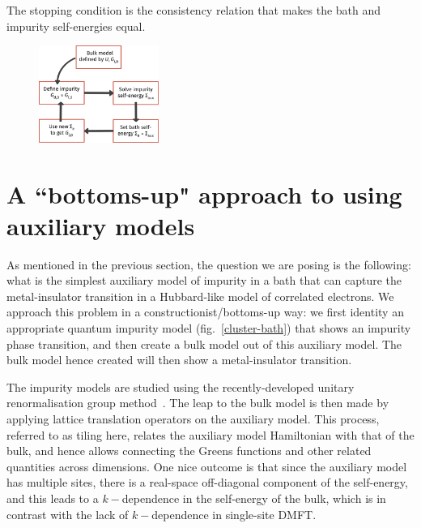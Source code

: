 \documentclass[reprint,hidelinks,onecolumn]{revtex4-2}
\begin{document}
The stopping condition is the consistency relation that makes the bath and impurity self-energies equal.

\begin{figure}[!htb]
	\centering
	\includegraphics[width=0.35\textwidth]{dmft_scheme.pdf}
\end{figure}


\section{A ``bottoms-up" approach to using auxiliary models}
As mentioned in the previous section, the question we are posing is the following: what is the simplest auxiliary model of impurity in a bath that can capture the metal-insulator transition in a Hubbard-like model of correlated electrons. We approach this problem in a constructionist/bottoms-up way: we first identity an appropriate quantum impurity model (fig.~\ref{cluster-bath}) that shows an impurity phase transition, and then create a bulk model out of this auxiliary model. The bulk model hence created will then show a metal-insulator transition. 

The impurity models are studied using the recently-developed unitary renormalisation group method~\cite{anirbanmott1,anirbanmott2,anirbanurg1,anirbanurg2,siddharthacpi,santanukagome}. The leap to the bulk model is then made by applying lattice translation operators on the auxiliary model. This process, referred to as tiling here, relates the auxiliary model Hamiltonian with that of the bulk, and hence allows connecting the Greens functions and other related quantities across dimensions. One nice outcome is that since the auxiliary model has multiple sites, there is a real-space off-diagonal component of the self-energy, and this leads to a \(k-\)dependence in the self-energy of the bulk, which is in contrast with the lack of \(k-\)dependence in single-site DMFT.  
\end{document}
